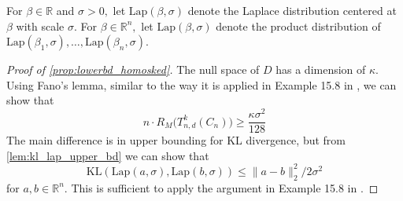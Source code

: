 \documentclass[ejs,noshowframe]{imsart}
\theoremstyle{plain}
\theoremstyle{definition}
\newcommand{\R}{\mathbb{R}}
\newcommand{\lap}{\mathrm{Lap}}
\newcommand{\kl}{\mathrm{KL}}
\newcommand{\ktvset}{T}
\begin{document}
\begin{appendix}
For $\beta\in \R$ and $\sigma>0,$ 
	let $\mathrm{Lap}(\beta,\sigma)$ denote the Laplace distribution 
centered at $\beta$ with scale $\sigma.$
	For $\beta \in \R^n,$ let $\mathrm{Lap}(\beta,\sigma)$ denote the 
product distribution of $\mathrm{Lap}(\beta_1,\sigma), \dots,  
\mathrm{Lap}(\beta_n,\sigma).$
	
\begin{proof}[Proof of \autoref{prop:lowerbd_homosked}] 
The null space of $D$ has a dimension of $\kappa$. Using Fano's lemma, similar 
to the way it is applied in Example 15.8 in \citet{wainwright2019high}, we can 
show that 
\begin{equation}
\label{eq:lb_null_space}
n \cdot R_M \big( \ktvset_{n,d}^k (C_n)  \big) \geq \frac{\kappa \sigma^2}{128}
\end{equation}
The main difference is in upper bounding for KL divergence, but from 
\autoref{lem:kl_lap_upper_bd} we can show that
\begin{equation}
\label{eq:kl_bd_lap}
\kl \left(\lap(a, \sigma), \lap(b, \sigma) \right) 
\leq \| a - b \|_2^2 / 2\sigma^2
\end{equation}
for $a,b \in \R^n.$
This is sufficient to apply the argument in Example 15.8 in 
\cite{wainwright2019high}.


\end{proof}
\end{appendix}
\end{document}
